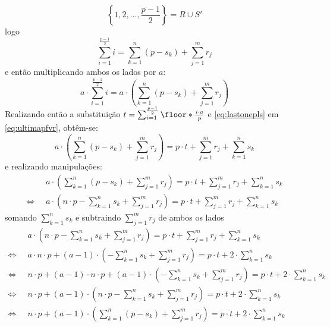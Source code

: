 \begin{equation*}
    \left\{1, 2, ..., \frac{p-1}{2}\right\} = R \cup S'
\end{equation*}
logo
\begin{equation} \label{eq:achoqehaultima}
    \sum_{i = 1}^{\frac{p-1}{2}} i = \sum_{k = 1}^{n} (p - s_k) + \sum_{j = 1}^{m} r_j
\end{equation}
e então multiplicando ambos os lados por $a$:
\begin{equation} \label{eq:lastonepls}
    a \cdot \sum_{i = 1}^{\frac{p-1}{2}} i = a \cdot \left( \sum_{k = 1}^{n} (p - s_k) + \sum_{j = 1}^{m} r_j \right)
\end{equation}
Realizando então a substituição $t = \sum_{i = 1}^{\frac{p-1}{2}} \floor*{\frac{i \cdot a}{p}}$ e \ref{eq:lastonepls} em \ref{eq:ultimapfvr}, obtêm-se:
\begin{equation*}
    a \cdot \left( \sum_{k = 1}^{n} (p - s_k) + \sum_{j = 1}^{m} r_j \right) = p \cdot t + \sum_{j = 1}^{m} r_j + \sum_{k = 1}^{n} s_k
\end{equation*}
e realizando manipulações:
\begin{align*}
    & a \cdot \left( \sum_{k = 1}^{n} (p - s_k) + \sum_{j = 1}^{m} r_j \right) = p \cdot t + \sum_{j = 1}^{m} r_j + \sum_{k = 1}^{n} s_k
    \\
    \Longleftrightarrow \; \;
    & a \cdot \left( n \cdot p - \sum_{k = 1}^{n} s_k + \sum_{j = 1}^{m} r_j \right) = p \cdot t + \sum_{j = 1}^{m} r_j + \sum_{k = 1}^{n} s_k
\end{align*}
somando $\sum_{k = 1}^{n} s_k$ e subtraindo $\sum_{j = 1}^{m} r_j$ de ambos os lados
\begin{align*}
    & a \cdot \left( n \cdot p - \sum_{k = 1}^{n} s_k + \sum_{j = 1}^{m} r_j \right) = p \cdot t + \sum_{j = 1}^{m} r_j + \sum_{k = 1}^{n} s_k
    \\
    \Longleftrightarrow \; \;
    & a \cdot n \cdot p + (a - 1) \cdot \left( - \sum_{k = 1}^{n} s_k + \sum_{j = 1}^{m} r_j \right) = p \cdot t + 2 \cdot \sum_{k = 1}^{n} s_k
    \\
    \Longleftrightarrow \; \;
    & n \cdot p + (a - 1) \cdot n \cdot p + (a - 1) \cdot \left( - \sum_{k = 1}^{n} s_k + \sum_{j = 1}^{m} r_j \right) = p \cdot t + 2 \cdot \sum_{k = 1}^{n} s_k
    \\
    \Longleftrightarrow \; \;
    & n \cdot p  + (a - 1) \cdot \left(n \cdot p - \sum_{k = 1}^{n} s_k + \sum_{j = 1}^{m} r_j \right) = p \cdot t + 2 \cdot \sum_{k = 1}^{n} s_k
    \\
    \Longleftrightarrow \; \;
    & n \cdot p  + (a - 1) \cdot \left(\sum_{k = 1}^{n} (p - s_k) + \sum_{j = 1}^{m} r_j \right) = p \cdot t + 2 \cdot \sum_{k = 1}^{n} s_k
\end{align*}
